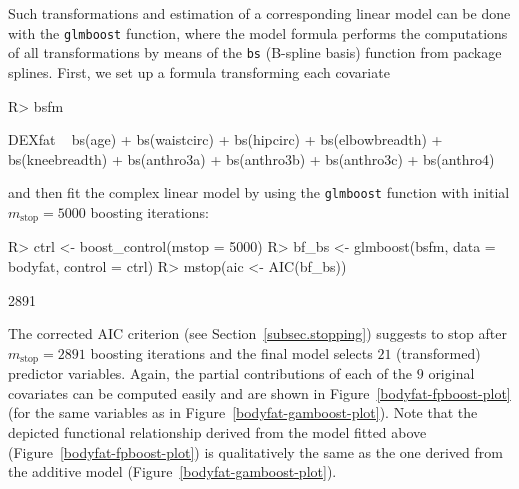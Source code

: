 \documentclass{article}
\newcommand{\Rpackage}[1]{{\normalfont\fontseries{b}\selectfont #1}}
\newcommand{\Rcmd}[1]{\texttt{#1}}
\newenvironment{Schunk}{}{}
\begin{document}
Such transformations and estimation of a corresponding linear model can be
done with the \Rcmd{glmboost} function,
where the model formula performs the computations of all transformations by 
means of the \Rcmd{bs} (B-spline basis) function from package \Rpackage{splines}. 
First, we set up a formula transforming each covariate 
\begin{Schunk}
\begin{Sinput}
R> bsfm
\end{Sinput}
\begin{Soutput}
DEXfat ~ bs(age) + bs(waistcirc) + bs(hipcirc) + bs(elbowbreadth) + 
    bs(kneebreadth) + bs(anthro3a) + bs(anthro3b) + bs(anthro3c) + 
    bs(anthro4)
\end{Soutput}
\end{Schunk}
and then fit the complex linear model by using the \Rcmd{glmboost} function with 
initial $m_\text{stop} = 5000$ boosting iterations:
\begin{Schunk}
\begin{Sinput}
R> ctrl <- boost_control(mstop = 5000)
R> bf_bs <- glmboost(bsfm, data = bodyfat, control = ctrl)
R> mstop(aic <- AIC(bf_bs))
\end{Sinput}
\begin{Soutput}
[1] 2891
\end{Soutput}
\end{Schunk}
The corrected AIC criterion (see Section~\ref{subsec.stopping}) suggests to
stop after $m_\text{stop} = 2891$ 
boosting iterations and the final model selects
$21$ (transformed) predictor
variables. Again, the partial 
contributions of each of the $9$ original covariates
can be computed 
easily and are shown in Figure~\ref{bodyfat-fpboost-plot} (for the same
variables as in Figure~\ref{bodyfat-gamboost-plot}). Note that the depicted
functional relationship derived from the model fitted above
(Figure~\ref{bodyfat-fpboost-plot}) is qualitatively the same as the one
derived from the additive model (Figure~\ref{bodyfat-gamboost-plot}).
\end{document}
